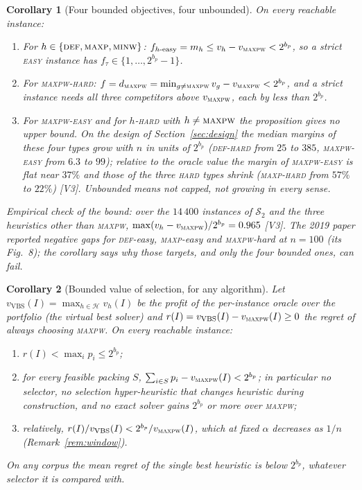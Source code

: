 \documentclass[a4paper,11pt]{article}
\newcommand{\bp}{b_{p}}
\newcommand{\heur}{\mathcal{H}}
\newcommand{\DEF}{\textsc{def}}
\newcommand{\MAXP}{\textsc{maxp}}
\newcommand{\MAXPW}{\textsc{maxpw}}
\newcommand{\MINW}{\textsc{minw}}
\newcommand{\evid}[1]{\textcolor{inkSoft}{\scriptsize[#1]}}
\theoremstyle{plain}
\newtheorem{corollary}{Corollary}
\theoremstyle{definition}
\theoremstyle{remark}
\begin{document}
\begin{corollary}[Four bounded objectives, four unbounded]\label{cor:window}
On every reachable instance:
\begin{enumerate}[leftmargin=1.8em,itemsep=2pt]
\item For $h\in\{\DEF,\MAXP,\MINW\}$: $f_{h\text{-easy}}=m_h\le v_h-v_{\MAXPW}<2^{\bp}$, so a
strict \textsc{easy} instance has $f_\tau\in\{1,\dots,2^{\bp}-1\}$.
\item For \MAXPW-\textsc{hard}: $f=d_{\MAXPW}=\min_{g\ne\MAXPW}v_g-v_{\MAXPW}<2^{\bp}$, and a
strict instance needs all three competitors above $v_{\MAXPW}$, each by less than $2^{\bp}$.
\item For \MAXPW-\textsc{easy} and for $h$-\textsc{hard} with $h\ne\MAXPW$ the proposition
gives no upper bound. On the design of Section~\ref{sec:design} the median margins of these
four types grow with $n$ in units of $2^{\bp}$ (\DEF-\textsc{hard} from $25$ to $385$,
\MAXPW-\textsc{easy} from $6.3$ to $99$); relative to the oracle value the margin of
\MAXPW-\textsc{easy} is flat near $37\%$ and those of the three \textsc{hard} types shrink
(\MAXP-\textsc{hard} from $57\%$ to $22\%$) \evid{V3}. Unbounded means not capped, not
growing in every sense.
\end{enumerate}
Empirical check of the bound: over the $14\,400$ instances of $\mathcal S_2$ and the three
heuristics other than \MAXPW, $\max(v_h-v_{\MAXPW})/2^{\bp}=0.965$ \evid{V3}. The 2019 paper
reported negative gaps for \DEF-easy, \MAXP-easy and \MAXPW-hard at $n=100$ (its Fig.~8);
the corollary says why those targets, and only the four bounded ones, can fail.
\end{corollary}

\begin{corollary}[Bounded value of selection, for any algorithm]\label{cor:regret}
Let $v_{\mathrm{VBS}}(I)=\max_{h\in\heur}v_h(I)$ be the profit of the per-instance oracle over
the portfolio (the virtual best solver) and $r(I)=v_{\mathrm{VBS}}(I)-v_{\MAXPW}(I)\ge0$ the
regret of always choosing \MAXPW. On every reachable instance:
\begin{enumerate}[leftmargin=1.8em,itemsep=2pt]
\item $r(I)<\max_ip_i\le2^{\bp}$;
\item for \emph{every} feasible packing $S$, $\sum_{i\in S}p_i-v_{\MAXPW}(I)<2^{\bp}$; in
particular no selector, no selection hyper-heuristic that changes heuristic during
construction, and no exact solver gains $2^{\bp}$ or more over \MAXPW;
\item relatively, $r(I)/v_{\mathrm{VBS}}(I)<2^{\bp}/v_{\MAXPW}(I)$, which at fixed $\alpha$
decreases as $1/n$ (Remark~\ref{rem:window}).
\end{enumerate}
On any corpus the mean regret of the single best heuristic is below $2^{\bp}$, whatever
selector it is compared with.
\end{corollary}
\end{document}
